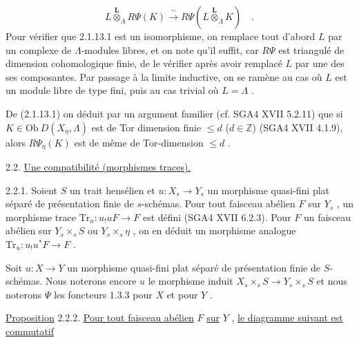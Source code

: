 
\begin{equation}\tag{2.1.13.1}
 L \overset{\mathbf{L}}{\otimes}_{\Lambda} R\Psi(K) \xrightarrow{\ \sim\ } R\Psi(L \overset{\mathbf{L}}{\otimes}_{\Lambda} K) \quad .
\end{equation}
Pour vérifier que 2.1.13.1 est un isomorphisme, on remplace tout d'abord $L$ par un complexe de $\Lambda$-modules libres, et on note qu'il suffit, car $R\Psi$ est triangulé de dimension cohomologique finie, de le vérifier après avoir remplacé $L$ par une des ses composantes. Par passage à la limite inductive, on se ramène au cas où $L$ est un module libre de type fini, puis au cas trivial où $L = \Lambda$ .

De (2.1.13.1) on déduit par un argument familier (cf. SGA4 XVII 5.2.11) que si $K \in \mathrm{Ob}\ D (X_\eta, \Lambda)$ est de Tor dimension finie $\leq d$ ($d \in \mathbb{Z}$) (SGA4 XVII 4.1.9), alors $R\Psi_\eta(K)$ est de même de Tor-dimension $\leq d$ .


2.2. \underline{Une compatibilité (morphismes traces).}

2.2.1. Soient $S$ un trait hensélien et $u : X_s \to Y_s$ un morphisme quasi-fini plat séparé de présentation finie de $s$-schémas. Pour tout faisceau abélien $F$ sur $Y_s$ , un morphisme trace $\mathrm{Tr}_u : u_! u F \to F$ est défini (SGA4 XVII 6.2.3). Pour $F$ un faisceau abélien sur $Y_s \times_s S$ ou $Y_s \times_s \eta$ , on en déduit un morphisme analogue $\mathrm{Tr}_u : u_! u^* F \to F$ .

Soit $u : X \to Y$ un morphisme quasi-fini plat séparé de présentation finie de $S$-schémas. Nous noterons encore $u$ le morphisme induit $X_s \times_s S \to Y_s \times_s S$ et nous noterons $\Psi$ les foncteurs 1.3.3 pour $X$ et pour $Y$ .

\underline{Proposition} 2.2.2. \underline{Pour tout faisceau abélien} $F$ \underline{sur} $Y$ , \underline{le diagramme suivant est commutatif}

